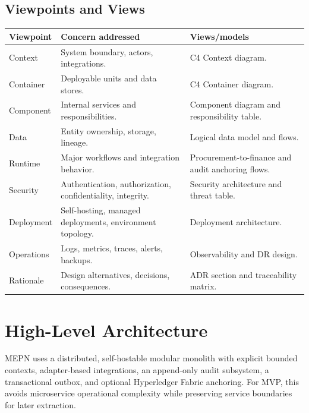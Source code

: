 \documentclass[11pt,a4paper]{article}
\newcommand{\codename}{MEPN}
\begin{document}
\subsection{Viewpoints and Views}
\begin{longtable}{L{32mm}L{62mm}L{46mm}}
\toprule
\textbf{Viewpoint} & \textbf{Concern addressed} & \textbf{Views/models} \\
\midrule
Context & System boundary, actors, integrations. & C4 Context diagram. \\
Container & Deployable units and data stores. & C4 Container diagram. \\
Component & Internal services and responsibilities. & Component diagram and responsibility table. \\
Data & Entity ownership, storage, lineage. & Logical data model and flows. \\
Runtime & Major workflows and integration behavior. & Procurement-to-finance and audit anchoring flows. \\
Security & Authentication, authorization, confidentiality, integrity. & Security architecture and threat table. \\
Deployment & Self-hosting, managed deployments, environment topology. & Deployment architecture. \\
Operations & Logs, metrics, traces, alerts, backups. & Observability and DR design. \\
Rationale & Design alternatives, decisions, consequences. & ADR section and traceability matrix. \\
\bottomrule
\end{longtable}

\section{High-Level Architecture}
\codename{} uses a distributed, self-hostable modular monolith with explicit bounded contexts, adapter-based integrations, an append-only audit subsystem, a transactional outbox, and optional Hyperledger Fabric anchoring. For MVP, this avoids microservice operational complexity while preserving service boundaries for later extraction.
\end{document}

